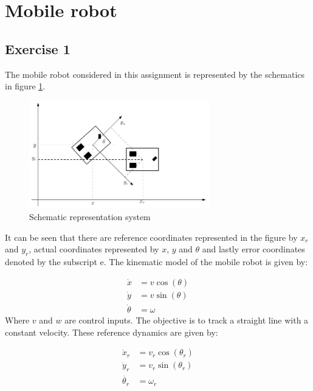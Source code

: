 \section{Mobile robot}
\subsection{Exercise 1}
The mobile robot considered in this assignment is represented by the schematics in figure \ref{fig:ex1_schematics}. 

\begin{figure}[H]
    \centering
    \includegraphics[width=0.7\textwidth]{Problems/ex1_schematic_system.PNG}
    \caption{Schematic representation system}
    \label{fig:ex1_schematics}
\end{figure}
It can be seen that there are reference coordinates represented in the figure by $x_r$ and $y_r$, actual coordinates represented by $x$, $y$ and $\theta$ and lastly error coordinates denoted by the subscript e. The kinematic model of the mobile robot is given by:

\begin{align}
    \dot{x} &= v \cos(\theta) \label{eq:ex1_kinmoda} \\
    \dot{y} &= v \sin (\theta) \label{eq:ex1_kinmodb}\\
    \dot{\theta} &= \omega \label{eq:ex1_kinmodc}
\end{align}
Where $v$ and $w$ are control inputs. The objective is to track a straight line with a constant velocity. These reference dynamics are given by:

\begin{align}
    \dot{x}_r &= v_r \cos(\theta_r) \label{eq:ex1_kinrefa}\\
    \dot{y}_r &= v_r \sin (\theta_r) \label{eq:ex1_kinrefb}\\
    \dot{\theta_r} &= \omega_r \label{eq:ex1_kinrefc}
\end{align}

